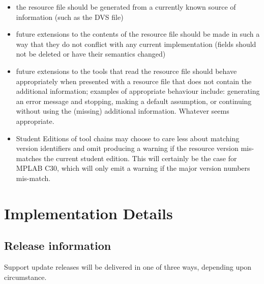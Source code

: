 \documentclass{article}
\begin{document}
  \begin{itemize}
    \item the resource file should be generated from a currently known source
          of information (such as the DVS file)
    \item future extensions to the contents of the resource file should be
          made in such a way that they do not conflict with any current
          implementation  (fields should not be deleted or have their semantics
          changed)
    \item future extensions to the tools that read the resource file should
          behave appropriately when presented with a resource file that
          does not contain the additional information; examples of appropriate
          behaviour include: generating an error message and stopping, 
          making a default assumption, or continuing without using the
          (missing) additional information.  Whatever seems appropriate.
\chgbarbegin
    \item Student Editions of tool chains may choose to care less about 
          matching version identifiers and omit producing a warning if the 
          resource version mis-matches the current student edition.  This will 
          certainly be the case for MPLAB C30, which will only emit a warning 
          if the major version numbers mis-match.
\chgbarend
  \end{itemize}

\section{Implementation Details}

\subsection{Release information}

\chgbarbegin
  Support update releases will be delivered in one of three ways, depending 
\chgbarend
  upon circumstance.
\end{document}

